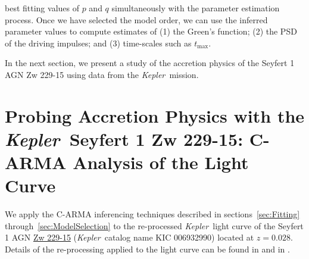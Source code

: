 \documentclass[a4paper,fleqn,usenatbib]{mnras}
\newcommand{\Kepler}{\textit{Kepler~}}
\begin{document}
best fitting values of $p$ and $q$ simultaneously with the parameter estimation process. Once we have selected the model order, we can use the inferred parameter values to compute estimates of (1) the Green's function; (2) the PSD of the driving impulses; and (3) time-scales such as $t_\mathrm{max}$.

In the next section, we present a study of the accretion physics of the Seyfert 1 AGN Zw 229-15 using data from the \Kepler mission.

\section[C-ARMA Analysis of Zw 229-15]{Probing Accretion Physics with the \Kepler Seyfert 1 Zw 229-15: C-ARMA Analysis of the Light Curve}\label{sec:Zw229-15}

We apply the C-ARMA inferencing techniques described in sections~\ref{sec:Fitting} through~\ref{sec:ModelSelection} to the re-processed \Kepler light curve of the Seyfert 1 AGN \href{http://ned.ipac.caltech.edu/cgi-bin/objsearch?objname=Zw+229-15&extend=no&hconst=73&omegam=0.27&omegav=0.73&corr_z=1&out_csys=Equatorial&out_equinox=J2000.0&obj_sort=RA+or+Longitude&of=pre_text&zv_breaker=30000.0&list_limit=5&img_stamp=YES}{Zw 229-15} (\Kepler catalog name KIC 006932990) located at $z = 0.028$. Details of the re-processing applied to the light curve can be found in \citep{CariniWilliamsAAS} and in \citet{Kasliwal15b}.



\end{document}
